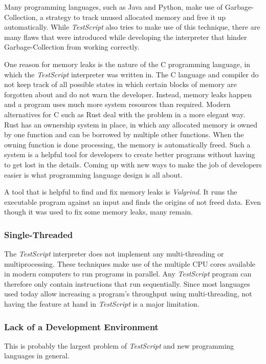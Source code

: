 \documentclass[12pt,a4paper]{article}
\newcommand{\name}{\emph{TestScript}}
\begin{document}
Many programming languages, such as Java and Python,
make use of Garbage-Collection, a strategy to track unused allocated memory and
free it up automatically. While \name{} also tries to make use of this technique,
there are many flaws that were introduced while developing the interpreter that hinder 
Garbage-Collection from working correctly.

One reason for memory leaks is the nature of the
C programming language, in which the \name{} interpreter was written in. The C language and
compiler do not keep track of all possible states in which certain blocks of memory are
forgotten about and do not warn the developer. Instead, memory leaks happen and a program
uses much more system resources than required.
Modern alternatives for C such as Rust deal with the problem in a more elegant way. 
Rust has an ownership system in place,
in which any allocated memory is owned by one function and can be borrowed by 
multiple other functions. When the owning function
is done processing, the memory is automatically freed. Such a system
is a helpful tool for developers to create better programs without having to get
lost in the details.
Coming up with new ways to make the job of developers easier is what programming
language design is all about.

A tool that is helpful to find and fix memory leaks is \emph{Valgrind}. It runs
the executable program against an input and finds the origins of not freed data.
Even though it was used to fix some memory leaks, many remain.

\subsubsection{Single-Threaded}
The \name{} interpreter does not implement any multi-threading or multiprocessing.
These techniques make use of the multiple CPU cores available in modern computers
to run programs in parallel.
Any \name{} program can therefore
only contain instructions that run sequentially.
Since most languages used today allow increasing a
program's throughput using multi-threading, not having the feature at hand in \name{}
is a major limitation.

\subsubsection{Lack of a Development Environment}
This is probably the largest problem of \name{} and new programming
languages in general.
\end{document}
